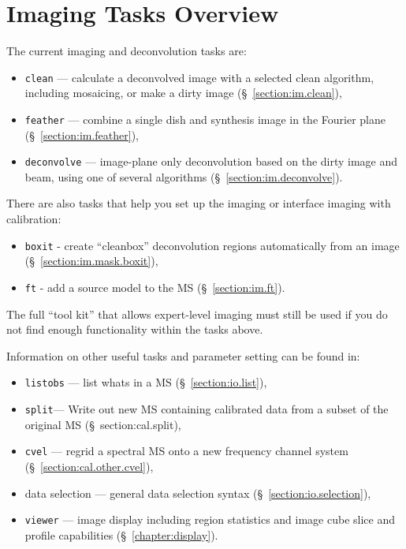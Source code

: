 \section{Imaging Tasks Overview}
\label{section:im.tasks}

The current imaging and deconvolution tasks are:
\begin{itemize}
   \item {\tt clean} --- calculate a deconvolved image with a selected clean
         algorithm, including mosaicing, or make a dirty image
         (\S~\ref{section:im.clean}),
   \item {\tt feather} --- combine a single dish and synthesis image in the
         Fourier plane (\S~\ref{section:im.feather}),
   \item {\tt deconvolve} --- image-plane only deconvolution based on
         the dirty image and beam, using one of several algorithms
         (\S~\ref{section:im.deconvolve}).
\end{itemize}

There are also tasks that help you set up the imaging or interface
imaging with calibration:

\begin{itemize}
   \item {\tt boxit} - create ``cleanbox'' deconvolution regions automatically
         from an image
	 (\S~\ref{section:im.mask.boxit}),
   \item {\tt ft} - add a source model to the MS (\S~\ref{section:im.ft}).
\end{itemize}

The full ``tool kit'' that allows expert-level imaging must still be
used if you do not find enough functionality within the tasks above. 

Information on other useful tasks and parameter setting can be found in:
\begin{itemize}
   \item {\tt listobs} --- list whats in a MS (\S~\ref{section:io.list}),
   \item {\tt split}--- Write out new MS containing calibrated data
      from a subset of the original MS (\S~{section:cal.split}),
   \item {\tt cvel} --- regrid a spectral MS onto a new frequency
      channel system
      (\S~\ref{section:cal.other.cvel}),
   \item data selection --- general data selection syntax
      (\S~\ref{section:io.selection}),
   \item {\tt viewer} --- image display including region statistics and
         image cube slice and profile capabilities
         (\S~\ref{chapter:display}).
\end{itemize}

